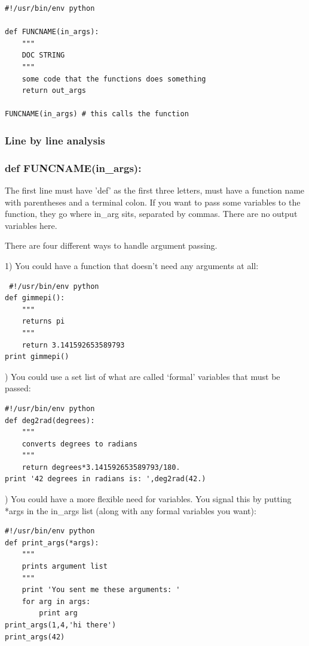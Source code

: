 \documentclass[11pt]{book}
\begin{document}
{{{{ \color{blue} \begin{verbatim}
#!/usr/bin/env python

def FUNCNAME(in_args):  
    """
    DOC STRING
    """
    some code that the functions does something
    return out_args
    
FUNCNAME(in_args) # this calls the function
\end{verbatim}}



\subsubsection{Line by line analysis}
\subsubsection{def FUNCNAME(in\_args):}

\noindent The first line must have 'def' as the first three letters, must have a function name with parentheses and a terminal colon.  If you want to pass some variables to the function, they go where  in\_arg sits, separated by commas.  There are no output variables here.  

 There are four different ways to handle argument passing. 
 
 1) You could have a function that doesn't  need any arguments at all:
 
 { \color{blue} \begin{verbatim}
 #!/usr/bin/env python
def gimmepi():  
    """
    returns pi
    """
    return 3.141592653589793
print gimmepi()
\end{verbatim}}

)  You could use  a set list of what are called `formal' variables that must be passed:  
 

{ \color{blue} \begin{verbatim}
#!/usr/bin/env python
def deg2rad(degrees):  
    """
    converts degrees to radians
    """
    return degrees*3.141592653589793/180.
print '42 degrees in radians is: ',deg2rad(42.)
\end{verbatim}}
    
) You could have a more flexible need for variables.  You signal this by putting  *args in the in\_args list (along with any formal variables you want):

{ \color{blue} \begin{verbatim}
#!/usr/bin/env python
def print_args(*args):
    """
    prints argument list
    """
    print 'You sent me these arguments: '
    for arg in args:
        print arg
print_args(1,4,'hi there')
print_args(42)
\end{verbatim}}

}}}
\end{document}
